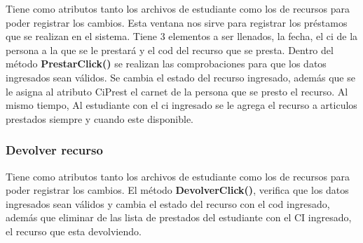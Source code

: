 \documentclass[12pt]{article}
\begin{document}
Tiene como atributos tanto los archivos de estudiante como los de recursos para poder registrar los cambios.  
Esta ventana nos sirve para registrar los préstamos que se realizan en el sistema.  Tiene 3 elementos a ser llenados, la fecha, el ci de la persona a la que se le prestará y el cod del recurso que se presta.  Dentro del método \textbf{PrestarClick()} se realizan las comprobaciones para que los datos ingresados sean válidos.  Se cambia el estado del recurso ingresado, además que se le asigna al atributo CiPrest el carnet de la persona que se presto el recurso.  Al mismo tiempo, Al estudiante con el ci ingresado se le agrega el recurso a articulos prestados siempre y cuando este disponible. 


\subsubsection{Devolver recurso}

Tiene como atributos tanto los archivos de estudiante como los de recursos para poder registrar los cambios.  
El método \textbf{DevolverClick()}, verifica que los datos ingresados sean válidos y cambia el estado del recurso con el cod ingresado, además que eliminar de las lista de prestados del estudiante con el CI ingresado, el recurso que esta devolviendo.  
\end{document}
